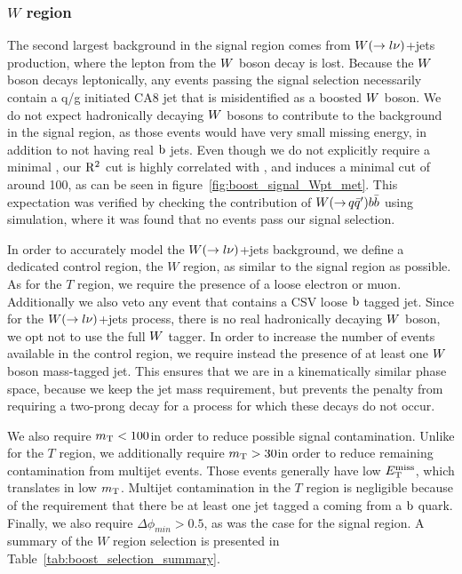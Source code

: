 

\subsubsection{\texorpdfstring{$W$}{W} region}

The second largest background in the signal region comes from $W(\rightarrow l\nu)$+jets
production, where the lepton from the $W$ boson decay is lost.
Because the $W$ boson decays leptonically, any events passing the signal selection necessarily
contain a q/g initiated CA8 jet that is misidentified as a boosted $W$ boson. 
We do not expect hadronically decaying $W$ bosons to contribute to the background in the signal
region, as those events would have very small missing energy, in addition to not having real
$\mathrm{b}$ jets. Even though we do not explicitly require a minimal \ETm, our $\mathrm{R^2}$ cut is highly
correlated with \ETm, and induces a minimal cut of around 100\GeV, as can be seen in
figure~\ref{fig:boost_signal_Wpt_met}. 
This expectation was verified by checking the contribution of $W({\rightarrow}\,
q\bar{q}')b\bar{b}$ using simulation, where it was found that no events pass our signal
selection. 

In order to accurately model the $W(\rightarrow l\nu)$+jets background, we define a dedicated
control region, the $W$ region, as similar to the signal region as possible. As for the $T$ region,
we require the presence of a loose electron or muon. Additionally we also veto any event that
contains a CSV loose $\mathrm{b}$ tagged jet.  
Since for the $W(\rightarrow l\nu)$+jets process, there is no real hadronically decaying $W$
boson, we opt not to use the full $W$ tagger. 
In order to increase the number of events available in the control region, we require instead the
presence of at least one $W$ boson mass-tagged jet. This ensures that we are in a kinematically
similar phase space, because we keep the jet mass requirement, but prevents the penalty from
requiring a two-prong decay for a process for which these decays do not occur. 

We also require $m_{\mathrm{T}} < 100$\GeV in order to reduce possible signal contamination. Unlike for the $T$
region, we additionally require $m_{\mathrm{T}} > 30$\GeV in order to reduce remaining contamination from
multijet events. Those events generally have low $E_{\mathrm{T}}^{\text{miss}}$, which translates in low $m_{\mathrm{T}}$. 
Multijet contamination in the $T$ region is negligible because of the
requirement that there be at least one jet tagged a coming from a $\mathrm{b}$ quark. 
Finally, we also require $\Delta\phi_{min} > 0.5$, as was the case for the signal region. 
A summary of the $W$ region selection is presented in Table~\ref{tab:boost_selection_summary}.

